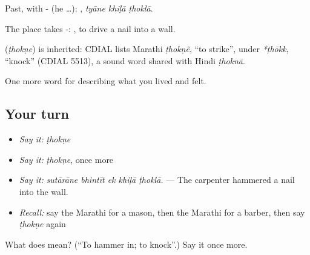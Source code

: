 Past, with - (he …):   , \emph{tyāne khiḷā ṭhoklā}.

The place takes -:   , to drive a nail into a wall.

\begin{cousinweb}
\textbf{} (\emph{ṭhokṇe}) is inherited: CDIAL lists Marathi \emph{ṭhokṇẽ}, \textquotedblleft{}to strike\textquotedblright{}, under \emph{*ṭhōkk}, \textquotedblleft{}knock\textquotedblright{} (CDIAL 5513), a sound word shared with Hindi \emph{ṭhoknā}.
\end{cousinweb}

\begin{grammarlens}[title={What you've built}]
One more word for describing what you lived and felt.
\end{grammarlens}

\subsection*{Your turn}
\begin{itemize}
\raggedright
  \item \emph{Say it:} \emph{ṭhokṇe}
  \item \emph{Say it:} \emph{ṭhokṇe}, once more
  \item \emph{Say it:} \emph{sutārāne bhintīt ek khiḷā ṭhoklā.} — The carpenter hammered a nail into the wall.
  \item \emph{Recall:} say the Marathi for a mason, then the Marathi for a barber, then say \emph{ṭhokṇe} again
\end{itemize}

\begin{tcolorbox}[breakable,colback=teal!4,colframe=teal!35!black,title={Before you move on}]
What does  mean? (\textquotedblleft{}To hammer in; to knock\textquotedblright{}.) Say it once more.
\end{tcolorbox}
